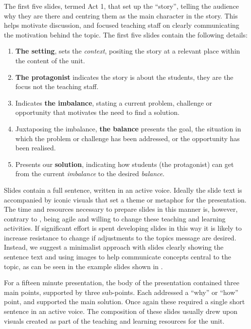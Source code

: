 The first five slides, termed Act 1, that set up the ``story'', telling the audience why they are there and centring them as the main character in the story. This helps motivate discussion, and focused teaching staff on clearly communicating the motivation behind the topic. The first five slides contain the following details:
\begin{enumerate}[label=Slide \arabic*:,labelwidth=*,align=left,noitemsep,nolistsep]
	\item \textbf{The setting}, sets the \emph{context}, positing the story at a relevant place within the content of the unit.
	\item \textbf{The protagonist} indicates the story is about the students, they are the focus not the teaching staff.
	\item Indicates \textbf{the imbalance}, stating a current problem, challenge or opportunity that motivates the need to find a solution.
	\item Juxtaposing the imbalance, \textbf{the balance} presents the goal, the situation in which the problem or challenge has been addressed, or the opportunity has been realised.
	\item Presents our \textbf{solution}, indicating how students (the protagonist) can get from the current \emph{imbalance} to the desired \emph{balance}.
\end{enumerate}

Slides contain a full sentence, written in an active voice. Ideally the slide text is accompanied by iconic visuals that set a theme or metaphor for the presentation. The time and resources necessary to prepare slides in this manner is, however, contrary to , being agile and willing to change these teaching and learning activities. If significant effort is spent developing slides in this way it is likely to increase resistance to change if adjustments to the topics message are desired. Instead, we suggest a minimalist approach with slides clearly showing the sentence text and using images to help communicate concepts central to the topic, as can be seen in the example slides shown in .

For a fifteen minute presentation, the body of the presentation contained three main points, supported by three sub-points. Each addressed a ``why'' or ``how'' point, and supported the main solution. Once again these required a single short sentence in an active voice. The composition of these slides usually drew upon visuals created as part of the teaching and learning resources for the unit.

